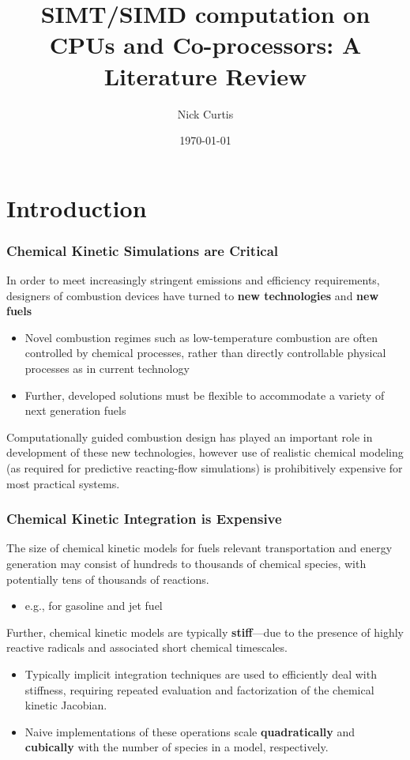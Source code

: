 \documentclass{beamer}
\title{SIMT\slash SIMD computation on CPUs and Co-processors: A Literature Review}
\author{Nick Curtis}
\institute{University of Connecticut}
\date{\today}
\begin{document}
\maketitle

\section{Introduction}

\begin{frame}
\frametitle{Chemical Kinetic Simulations are \textbf{Critical}}
In order to meet increasingly stringent emissions and efficiency requirements, designers of combustion devices have turned to \textbf{new technologies} and \textbf{new fuels}
\begin{itemize}
 \item Novel combustion regimes such as low-temperature combustion are often controlled by chemical processes, rather than directly controllable physical processes as in current technology
 \item Further, developed solutions must be flexible to accommodate a variety of next generation fuels
\end{itemize}
Computationally guided combustion design has played an important role in development of these new technologies, however use of realistic chemical modeling (as required for predictive reacting-flow simulations) is prohibitively expensive for most practical systems. 
\end{frame}

\begin{frame}
 \frametitle{Chemical Kinetic Integration is \textbf{Expensive}}
 The size of chemical kinetic models for fuels relevant transportation and energy generation may consist of hundreds to thousands of chemical species, with potentially tens of thousands of reactions.
 \begin{itemize}
  \item e.g., for gasoline  and jet fuel
 \end{itemize}
 Further, chemical kinetic models are typically \textbf{stiff}---due to the presence of highly reactive radicals and associated short chemical timescales.
 \begin{itemize}
  \item Typically implicit integration techniques are used to efficiently deal with stiffness, requiring repeated evaluation and factorization of the chemical kinetic Jacobian.
  \item Naive implementations of these operations scale \textbf{quadratically} and \textbf{cubically} with the number of species in a model, respectively.
 \end{itemize}
\end{frame}
\end{document}

